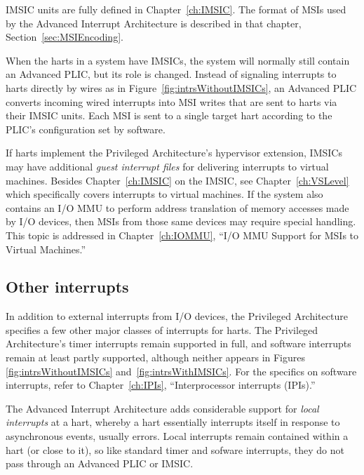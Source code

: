 IMSIC units are fully defined in Chapter~\ref{ch:IMSIC}.
The format of MSIs used by the {\RISCV} Advanced Interrupt Architecture
is described in that chapter, Section~\ref{sec:MSIEncoding}.

When the harts in a {\RISCV} system have IMSICs, the system will
normally still contain an Advanced PLIC, but its role is changed.
Instead of signaling interrupts to harts directly by wires as in
Figure~\ref{fig:intrsWithoutIMSICs}, an Advanced PLIC converts incoming
wired interrupts into MSI writes that are sent to harts via their IMSIC
units.
Each MSI is sent to a single target hart according to the PLIC's
configuration set by software.

If {\RISCV} harts implement the Privileged Architecture's hypervisor
extension, IMSICs may have additional \emph{guest interrupt files} for
delivering interrupts to virtual machines.
Besides Chapter~\ref{ch:IMSIC} on the IMSIC, see
Chapter~\ref{ch:VSLevel} which specifically covers interrupts to
virtual machines.
If the system also contains an I/O MMU to perform address translation
of memory accesses made by I/O devices, then MSIs from those same
devices may require special handling.
This topic is addressed in Chapter~\ref{ch:IOMMU}, ``I/O MMU Support
for MSIs to Virtual Machines.''

\subsection{Other interrupts}

In addition to external interrupts from I/O devices, the {\RISCV}
Privileged Architecture specifies a few other major classes of
interrupts for harts.
The Privileged Architecture's timer interrupts remain supported
in full, and software interrupts remain at least partly supported,
although neither appears in Figures \ref{fig:intrsWithoutIMSICs}
and~\ref{fig:intrsWithIMSICs}.
For the specifics on software interrupts, refer to
Chapter~\ref{ch:IPIs}, ``Interprocessor interrupts (IPIs).''

The Advanced Interrupt Architecture adds considerable support
for \emph{local interrupts} at a hart, whereby a hart essentially
interrupts itself in response to asynchronous events, usually errors.
Local interrupts remain contained within a hart (or close to it),
so like standard {\RISCV} timer and sofware interrupts, they do not
pass through an Advanced PLIC or IMSIC.

